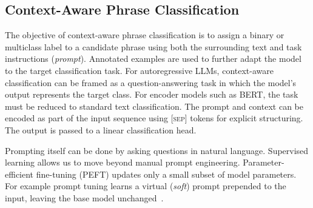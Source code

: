 \subsection{Context-Aware Phrase Classification}

The objective of context-aware phrase classification is to assign a
binary or multiclass label to a candidate phrase using both the
surrounding text and task instructions (\emph{prompt}). Annotated
examples are used to further adapt the model to the target
classification task. For autoregressive LLMs, context-aware
classification can be framed as a question-answering task in which
the model's output represents the target class. For encoder models
such as \textsc{BERT}, the task must be reduced to standard text
classification. The prompt and context can be encoded as part of the
input sequence using \textsc{[sep]} tokens for explicit structuring.
The output is passed to a linear classification head.

Prompting itself can be done by asking questions in natural language.
Supervised learning allows us to move beyond manual prompt
engineering. Parameter-efficient fine-tuning (PEFT) updates only a
small subset of model parameters. For example prompt tuning learns a
virtual (\emph{soft}) prompt prepended to the input, leaving the base
model unchanged~\cite{lester2021power}.
